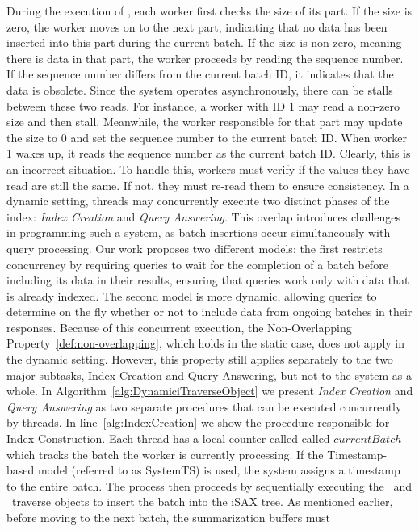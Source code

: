 {%
During the execution of \TP, each worker first checks the size of its part.
If the size is zero, the worker moves on to the next part, indicating that no data
has been inserted into this part during the current batch. If the size is non-zero,
meaning there is data in that part, the worker proceeds by reading the sequence number.
If the sequence number differs from the current batch ID, it indicates that the data
is obsolete.
% 
Since the system operates asynchronously, there can be stalls between these two reads.
For instance, a worker with ID 1 may read a non-zero size and then stall. Meanwhile,
the worker responsible for that part may update the size to 0 and set the sequence
number to the current batch ID. When worker 1 wakes up, it reads the sequence number
as the current batch ID. Clearly, this is an incorrect situation. To handle this,
workers must verify if the values they have read are still the same. If not, they
must re-read them to ensure consistency.
% 
In a dynamic setting, threads may concurrently execute two distinct phases of the index:
\textit{Index Creation} and \textit{Query Answering}. This overlap introduces challenges in programming
such a system, as batch insertions occur simultaneously with query processing. Our work
proposes two different models: the first restricts concurrency by requiring queries
to wait for the completion of a batch before including its data in their results,
ensuring that queries work only with data that is already indexed. The second model is
more dynamic, allowing queries to determine on the fly whether or not to include data
from ongoing batches in their responses. 
Because of this concurrent execution, the Non-Overlapping
Property~\ref{def:non-overlapping}, which holds in the static case, does not apply
in the dynamic setting. However, this property still applies separately to the two
major subtasks, Index Creation and Query Answering, but not to the system as a whole.
% 
In Algorithm~\ref{alg:DynamiciTraverseObject} we present 
\textit{Index Creation} and \textit{Query Answering} as two separate procedures that can
be executed concurrently by threads. In line~\ref{alg:IndexCreation} we show the
procedure responsible for Index Construction. Each thread has a local counter called
called $currentBatch$ which tracks the batch the worker is currently processing.
If the Timestamp-based model (referred to as SystemTS) is used, the system assigns a
timestamp to the entire batch. The process then proceeds by sequentially executing the
\BC\ and \TP\ traverse objects to insert the batch into the iSAX tree.
% 
As mentioned earlier, before moving to the next batch, the summarization buffers must
}
